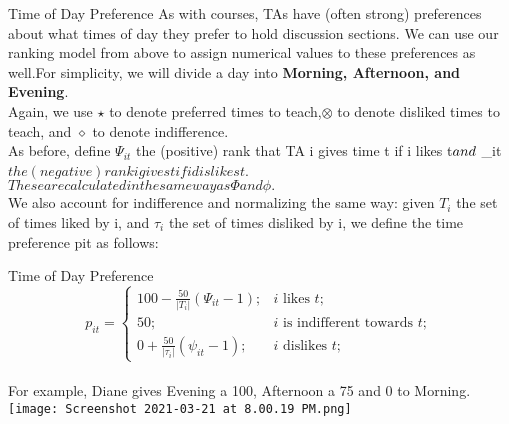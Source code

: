 \documentclass[9pt]{beamer}
\begin{document}
\begin{frame}{Time of Day Preference}
As with courses, TAs have (often strong) preferences about what times of day they prefer to hold discussion sections. We can use our ranking model from above to assign numerical values to these preferences as well.For simplicity, we will divide a day into \textbf{Morning, Afternoon, and Evening}.\\
\vspace{0.2cm}
\pause
Again, we use $ \star $ to denote preferred times to teach,$ \otimes $ to denote disliked times to teach, and $ \diamond $ to denote indifference.\\
\vspace{0.2cm}
\pause
As before, define $ \Psi_{it} $ the (positive) rank that TA i gives time t if i likes t$\\ 
and $ \psi_{it} $ the (negative) rank i gives t if i dislikes t$. $These are calculated in the same way as \Phi  and  \phi. $ \\
\vspace{0.2cm}
We also account for indifference and normalizing the same way: given $ T_i $ the set of times liked by i, and $ \tau_i $ the set of times disliked by i, we define the time preference pit as follows:
\end{frame} 

\begin{frame}{Time of Day Preference}
$$
p_{i t}=\left\{\begin{array}{lr}
100-\frac{50}{\left|T_{i}\right|}\left(\Psi_{i t}-1\right) ; & i \text { likes } t ; \\
50 ; & i \text { is indifferent towards } t ; \\
0+\frac{50}{\left|\tau_{i}\right|}\left(\psi_{i t}-1\right) ; & i \text { dislikes } t ;
\end{array}\right.
$$
\\
\vspace{0.2cm}
\pause
For example, Diane gives Evening a 100, Afternoon a 75 and 0 to Morning.\\
\centering
\texttt{[image: Screenshot 2021-03-21 at 8.00.19 PM.png]}
\end{frame} 
\end{document}
